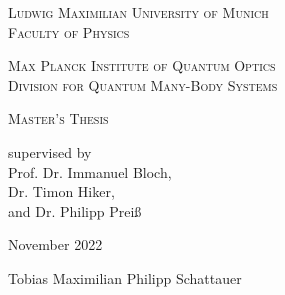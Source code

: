 \begin{titlepage}
    \vspace*{\fill}
    \centering

    \textsc{\Large Ludwig Maximilian University of Munich}\\
    \textsc{Faculty of Physics}

    \vspace{1cm}

    \textsc{\Large Max Planck Institute of Quantum Optics}\\
    \textsc{Division for Quantum Many-Body Systems}

    \vspace{2.5cm}

    \begin{doublespace}
        \makeatletter
        \textsc{ \Huge \@title}
        \makeatother
    \end{doublespace}


    \vspace{2.5cm}
    \huge \textsc{Master's Thesis}



    \vspace{0.3cm}
    \large \textrm{supervised by\\Prof. Dr. Immanuel Bloch,\\Dr. Timon Hiker,\\and Dr. Philipp Preiß}

    \vspace{1.5cm}
    \huge
    \textrm{November 2022}

    \vspace{1.5cm}
    \Large \textrm{Tobias Maximilian Philipp Schattauer}

    \vspace*{\fill}
\end{titlepage}




\begin{titlepage}
    \null
\end{titlepage}



